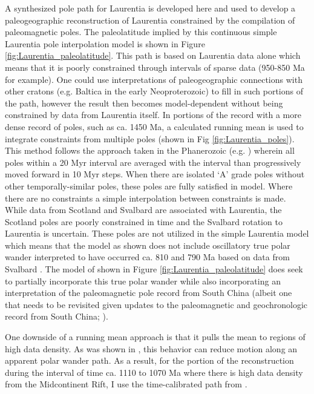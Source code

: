 \documentclass[twocolumn, switch]{article} %
\begin{document}
A synthesized pole path for Laurentia is developed here and used to develop a paleogeographic reconstruction of Laurentia constrained by the compilation of paleomagnetic poles. The paleolatitude implied by this continuous simple Laurentia pole interpolation model is shown in Figure \ref{fig:Laurentia_paleolatitude}. This path is based on Laurentia data alone which means that it is poorly constrained through intervals of sparse data (950-850 Ma for example). One could use interpretations of paleogeographic connections with other cratons (e.g. Baltica in the early Neoproterozoic) to fill in such portions of the path, however the result then becomes model-dependent without being constrained by data from Laurentia itself. In portions of the record with a more dense record of poles, such as ca. 1450 Ma, a calculated running mean is used to integrate constraints from multiple poles (shown in Fig \ref{fig:Laurentia_poles}). This method follows the approach taken in the Phanerozoic (e.g. \citealp{Torsvik2012a}) wherein all poles within a 20 Myr interval are averaged with the interval than progressively moved forward in 10 Myr steps. When there are isolated `A' grade poles without other temporally-similar poles, these poles are fully satisfied in model. Where there are no constraints a simple interpolation between constraints is made. While data from Scotland and Svalbard are associated with Laurentia, the Scotland poles are poorly constrained in time and the Svalbard rotation to Laurentia is uncertain. These poles are not utilized in the simple Laurentia model which means that the model as shown does not include oscillatory true polar wander interpreted to have occurred ca. 810 and 790 Ma based on data from Svalbard \citep{Maloof2006a}. The model of \cite{Li2013a} shown in Figure \ref{fig:Laurentia_paleolatitude} does seek to partially incorporate this true polar wander while also incorporating an interpretation of the paleomagnetic pole record from South China (albeit one that needs to be revisited given updates to the paleomagnetic and geochronologic record from South China; \citealp{Zhang2021a}).

One downside of a running mean approach is that it pulls the mean to regions of high data density. As was shown in \cite{Swanson-Hysell2019a}, this behavior can reduce motion along an apparent polar wander path. As a result, for the portion of the reconstruction during the interval of time ca. 1110 to 1070 Ma where there is high data density from the Midcontinent Rift, I use the time-calibrated path from \cite{Swanson-Hysell2019a}.
\end{document}

